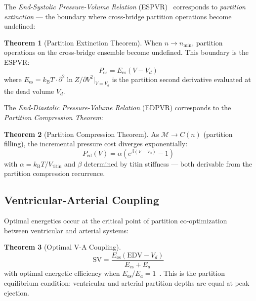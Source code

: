\documentclass[10pt,twocolumn,a4paper]{article}
\theoremstyle{definition}
\newtheorem{theorem}{Theorem}
\newcommand{\kB}{k_{\text{B}}}
\newcommand{\kBT}{k_{\text{B}}T}
\begin{document}
The \emph{End-Systolic Pressure-Volume Relation} (ESPVR)~\cite{suga1974instantaneous,sagawa1988cardiac} corresponds to
\emph{partition extinction} — the boundary where cross-bridge partition
operations become undefined:

\begin{theorem}[Partition Extinction Theorem]
When $n \to n_{\min}$, partition operations on the cross-bridge ensemble
become undefined. This boundary is the ESPVR:
\begin{equation}
\boxed{P_{\text{es}} = E_{\text{es}}(V - V_d)}
\end{equation}
where $E_{\text{es}} = \kB T \cdot \partial^2 \ln Z / \partial V^2 \big|_{V=V_d}$
is the partition second derivative evaluated at the dead volume $V_d$.
\end{theorem}

The \emph{End-Diastolic Pressure-Volume Relation} (EDPVR) corresponds to
the \emph{Partition Compression Theorem}:

\begin{theorem}[Partition Compression Theorem]
As $\mathcal{M} \to C(n)$ (partition filling), the incremental pressure cost
diverges exponentially:
\begin{equation}
\boxed{P_{\text{ed}}(V) = \alpha\left(e^{\beta(V - V_0)} - 1\right)}
\end{equation}
with $\alpha = \kBT / V_{\text{titin}}$ and $\beta$ determined by titin
stiffness — both derivable from the partition compression recurrence.
\end{theorem}

\subsection{Ventricular-Arterial Coupling}

Optimal energetics occur at the critical point of partition co-optimization
between ventricular and arterial systems:

\begin{theorem}[Optimal V-A Coupling]
\begin{equation}
\text{SV} = \frac{E_{\text{es}}(\text{EDV} - V_d)}{E_{\text{es}} + E_a}
\end{equation}
with optimal energetic efficiency when $E_{\text{es}} / E_a = 1$~\cite{sunagawa1983optimal,burkhoff1993contractility}.
This is the partition equilibrium condition: ventricular and arterial
partition depths are equal at peak ejection.
\end{theorem}
\end{document}
